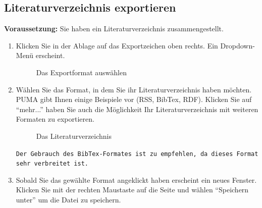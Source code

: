 \subsection{Literaturverzeichnis exportieren}
\label{subsec:lvExportieren}
\textbf{Voraussetzung:} Sie haben ein Literaturverzeichnis zusammengestellt.
\begin{enumerate}
    \item Klicken Sie in der Ablage auf das Exportzeichen oben rechts. Ein Dropdown-Menü erscheint.
\begin{figure}[h!]
 \centering
 \caption{Das Exportformat auswählen}
 \label{fig:exportformatAuswaehlen}
\end{figure}
    \item Wählen Sie das Format, in dem Sie ihr Literaturverzeichnis haben möchten. PUMA gibt Ihnen einige Beispiele vor (RSS, BibTex, RDF). Klicken Sie auf \enquote{mehr...} haben Sie auch die Möglichkeit Ihr Literaturverzeichnis mit weiteren Formaten zu exportieren. 
\begin{figure}[h!]
 \centering
 \caption{Das Literaturverzeichnis}
 \label{fig:literaturverzeichnis}
\end{figure}
\begin{mdframed}[style=mdfexample1,frametitle={\texttt{TIPP}},backgroundcolor=gray!40] \texttt{Der Gebrauch des BibTex-Formates ist zu empfehlen, da dieses Format sehr verbreitet ist.}
\end{mdframed}
    \item Sobald Sie das gewählte Format angeklickt haben erscheint ein neues Fenster. Klicken Sie mit der rechten Maustaste auf die Seite und wählen \enquote{Speichern unter} um die Datei zu speichern.
\end{enumerate}

